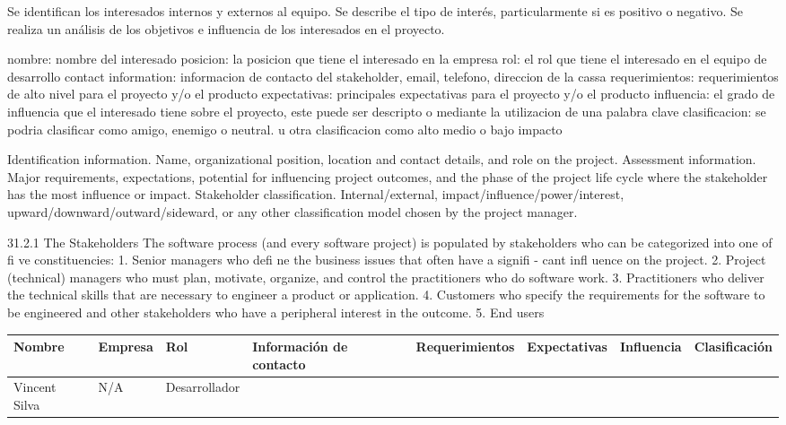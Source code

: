 Se identifican los interesados internos y
externos al equipo. Se describe el tipo de
interés, particularmente si es positivo o
negativo. Se realiza un análisis de los objetivos
e influencia de los interesados en el proyecto.


nombre: nombre del interesado
posicion: la posicion que tiene el interesado en la empresa
rol: el rol que tiene el interesado en el equipo de desarrollo
contact information: informacion de contacto del stakeholder, email, telefono, direccion de la cassa
requerimientos: requerimientos de alto nivel para el proyecto y/o el producto
expectativas: principales expectativas para el proyecto y/o el producto
influencia: el grado de influencia que el interesado tiene sobre el proyecto, este puede ser descripto o mediante la utilizacion de una palabra clave
clasificacion: se podria clasificar como amigo, enemigo o neutral. u otra clasificacion como alto medio o bajo impacto


Identification information. Name, organizational position, location and
contact details, and role on the project.
Assessment information. Major requirements, expectations, potential for
influencing project outcomes, and the phase of the project life cycle where the
stakeholder has the most influence or impact.
Stakeholder classification. Internal/external, impact/influence/power/interest,
upward/downward/outward/sideward, or any other classification model chosen
by the project manager.

31.2.1 The Stakeholders
The software process (and every software project) is populated by stakeholders
who can be categorized into one of fi ve constituencies:
1. Senior managers who defi ne the business issues that often have a signifi -
cant infl uence on the project.
2. Project (technical) managers who must plan, motivate, organize, and control
the practitioners who do software work.
3. Practitioners who deliver the technical skills that are necessary to engineer
a product or application.
4. Customers who specify the requirements for the software to be engineered
and other stakeholders who have a peripheral interest in the
outcome.
5. End users

\newpage

\begin{table}[h!]
\begin{tabular}{|l|l|l|l|l|l|l|l|}
\hline
    \textbf{Nombre} & \textbf{Empresa}  & \textbf{Rol}  & \textbf{Información de contacto}  & \textbf{Requerimientos}   & \textbf{Expectativas} & \textbf{Influencia}   & \textbf{Clasificación} \\ \hline
    Vincent Silva   & N/A & Desarrollador
\end{tabular}
\end{table}